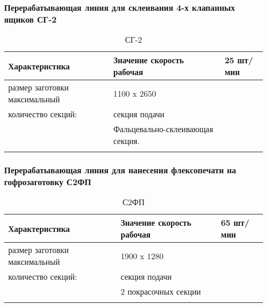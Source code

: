 \subsubsection{Перерабатывающая линия для склеивания 4-х клапанных ящиков СГ-2}
\begin{longtable}{|p{10cm}|p{5cm}|}
    \hline
	\textbf{Характеристика} & \textbf{Значение}
	\endhead
  	\hline 
скорость рабочая                         	& 25 шт/мин\\
  	\hline 
размер заготовки максимальный   & 1100 x 2650  \\
  	\hline 
количество секций: 
& секция подачи\\
& Фальцевально-склеивающая секция. \\
\hline 
  \caption{СГ-2}\label{tab:line1}
\end{longtable}

\subsubsection{Перерабатывающая линия для нанесения флексопечати на гофрозаготовку С2ФП}
\begin{longtable}{|p{10cm}|p{5cm}|}
    \hline
	\textbf{Характеристика} & \textbf{Значение}
	\endhead
  	\hline 
скорость рабочая                         	& 65 шт/мин\\
  	\hline 
размер заготовки максимальный   & 1900 x 1280  \\
  	\hline 
количество секций: 
& секция подачи\\
& 2 покрасочных секции \\
\hline 
  \caption{С2ФП}\label{tab:line1}
\end{longtable}

